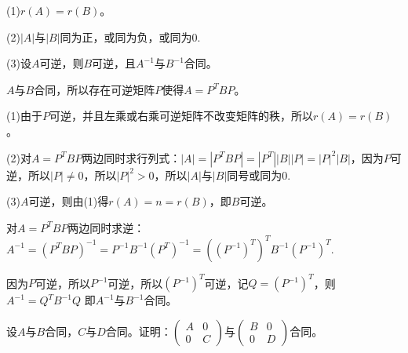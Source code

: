 \documentclass[a4paper]{report}
\begin{document}
(1)$r(A)=r(B)$。

(2)$|A|$与$|B|$同为正，或同为负，或同为0.

(3)设$A$可逆，则$B$可逆，且$A^{-1}$与$B^{-1}$合同。

\begin{zhengming}
$A$与$B$合同，所以存在可逆矩阵$P$使得$A=P^TBP$。

(1)由于$P$可逆，并且左乘或右乘可逆矩阵不改变矩阵的秩，所以$r(A)=r(B)$。

(2)对$A=P^TBP$两边同时求行列式：$|A|=|P^TBP|=|P^T||B||P|=|P|^2|B|$，因为$P$可逆，所以$|P|\neq 0$，所以$|P|^2>0$，所以$|A|$与$|B|$同号或同为0.

(3)$A$可逆，则由(1)得$r(A)=n=r(B)$，即$B$可逆。

对$A=P^TBP$两边同时求逆：$A^{-1}=(P^TBP)^{-1}=P^{-1}B^{-1}(P^{T})^{-1}=((P^{-1})^T)^TB^{-1}(P^{-1})^{T}$.

因为$P$可逆，所以$P^{-1}$可逆，所以$(P^{-1})^T$可逆，记$Q=(P^{-1})^T$，则$A^{-1}=Q^TB^{-1}Q$
即$A^{-1}$与$B^{-1}$合同。
\end{zhengming}

\EX 设$A$与$B$合同，$C$与$D$合同。证明：$
\begin{pmatrix}
A&0\\
0&C
\end{pmatrix}
$与$\begin{pmatrix}
B&0\\
0&D
\end{pmatrix}
$合同。
\end{document}
